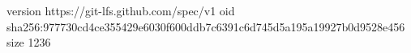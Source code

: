 version https://git-lfs.github.com/spec/v1
oid sha256:977730cd4ce355429e6030f600ddb7c6391c6d745d5a195a19927b0d9528e456
size 1236
